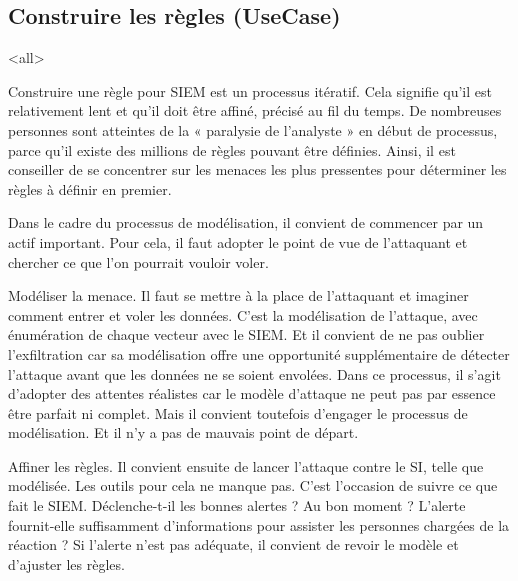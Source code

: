 \subsection{Construire les règles (UseCase)}




\mode<all>{}


Construire une règle pour SIEM est un processus itératif. Cela signifie qu’il est relativement lent et qu’il doit être affiné, précisé au fil du temps. De nombreuses personnes sont atteintes de la « paralysie de l’analyste » en début de processus, parce qu’il existe des millions de règles pouvant être définies. Ainsi, il est  conseiller de se concentrer sur les menaces les plus pressentes pour déterminer les règles à définir en premier.

Dans le cadre du processus de modélisation, il convient de commencer par un actif important. Pour cela, il faut adopter le point de vue de l’attaquant et chercher ce que l’on pourrait vouloir voler.

Modéliser la menace. Il faut se mettre à la place de l’attaquant et imaginer comment entrer et voler les données. C’est la modélisation de l’attaque, avec énumération de chaque vecteur avec le SIEM. Et il convient de ne pas oublier l’exfiltration car sa modélisation offre une opportunité supplémentaire de détecter l’attaque avant que les données ne se soient envolées. Dans ce processus, il s’agit d’adopter des attentes réalistes car le modèle d’attaque ne peut pas par essence être parfait ni complet. Mais il convient toutefois d’engager le processus de modélisation. Et il n’y a pas de mauvais point de départ.

Affiner les règles. Il convient ensuite de lancer l’attaque contre le SI, telle que modélisée. Les outils pour cela ne manque pas. C’est l’occasion de suivre ce que fait le SIEM. Déclenche-t-il les bonnes alertes ? Au bon moment ? L’alerte fournit-elle suffisamment d’informations pour assister les personnes chargées de la réaction ? Si l’alerte n’est pas adéquate, il convient de revoir le modèle et d’ajuster les règles.

